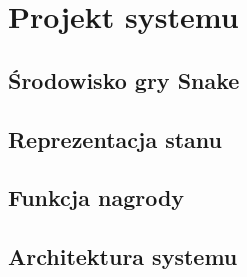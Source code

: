 \section{Projekt systemu}
\label{sec:projekt}

\subsection{Środowisko gry Snake}
\subsection{Reprezentacja stanu}
\subsection{Funkcja nagrody}
\subsection{Architektura systemu}